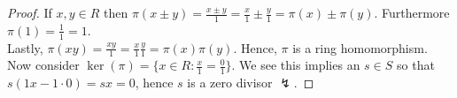 \begin{proof}
	If \(x, y \in R\) then \(\pi\left( x \pm y \right) = \frac{x \pm y}{1} = \frac{x}{1} \pm \frac{y}{1} = \pi\left( x \right) \pm \pi\left( y \right) \). Furthermore \(\pi\left( 1 \right) = \frac{1}{1} = 1\).\\
	Lastly, \(\pi\left( xy \right) = \frac{xy}{1} = \frac{x}{1}\frac{y}{1} = \pi\left( x \right) \pi\left( y \right) \). Hence, \(\pi\) is a ring homomorphism. Now consider \(\ker \left( \pi \right) = \{x \in R : \frac{x}{1} = \frac{0}{1}\} \). We see this implies an \(s \in S\) so that \(s\left( 1x - 1\cdot 0 \right) = sx = 0 \), hence \(s\) is a zero divisor \(\lightning\).
\end{proof}
